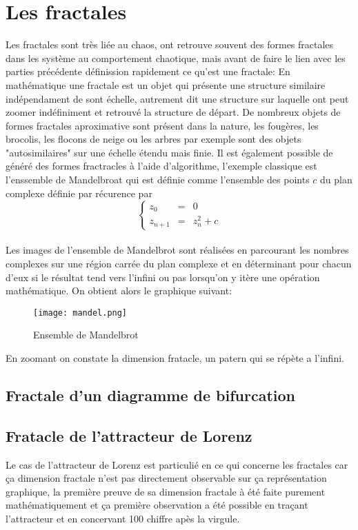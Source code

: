 \chapter{Les fractales}
\label{chapter:fractales}
Les fractales sont très liée au chaos, ont retrouve souvent des formes fractales dans les système au comportement chaotique, mais avant de faire le lien avec les parties précédente définission rapidement ce qu'est une fractale: En mathématique une fractale est un objet qui présente une structure similaire indépendament de sont échelle, autrement dit une structure sur laquelle ont peut zoomer indéfiniment et retrouvé la structure de départ. De nombreux objets de formes fractales aproximative sont présent dans la nature, les fougères, les brocolis, les flocons de neige ou les arbres par exemple sont des objets "autosimilaires" sur une échelle étendu mais finie. Il est également possible de généré des formes fractracles à l'aide d'algorithme, l'exemple classique est l'enssemble de Mandelbroat qui est définie comme l'ensemble des points $c$ du plan complexe définie par récurence par\\
\[
    \left\{
    \begin{array}{rcl}
        z_0&=&0\\
        z_{n+1}&=&z_{n}^2+c
    \end{array}
    \right.
\]\\
Les images de l'ensemble de Mandelbrot sont réalisées en parcourant les nombres complexes sur une région carrée du plan complexe et en déterminant pour chacun d'eux si le résultat tend vers l'infini ou pas lorsqu'on y itère une opération mathématique. On obtient alors le graphique suivant:

\begin{figure}[!ht]
    \centering
    \texttt{[image: mandel.png]}
    \caption{\label{fig:mandel} Ensemble de Mandelbrot} 
\end{figure}

En zoomant on constate la dimension fratacle, un patern qui se répète a l'infini.


\section{Fractale d'un diagramme de bifurcation}

\section{Fratacle de l'attracteur de Lorenz}
Le cas de l'attracteur de Lorenz est particulié en ce qui concerne les fractales car ça dimension fractale n'est pas directement observable sur ça représentation graphique, la première preuve de sa dimension fractale à été faite purement mathématiquement et ça première observation a été possible en traçant l'attracteur et en concervant 100 chiffre apès la virgule.